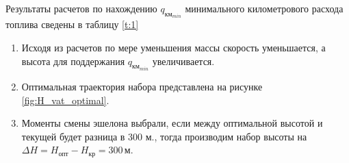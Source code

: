 Результаты расчетов по нахождению $q_{{км}_{min}}$ минимального километрового расхода топлива сведены в таблицу \ref{t:1}

\begin{enumerate}
\item Исходя из расчетов по мере уменьшения массы скорость уменьшается, а высота для поддержания $q_{{км}_{min}}$ увеличивается.
\item Оптимальная траектория набора представлена на рисунке \ref{fig:H_vat_optimal}.
\item Моменты смены эшелона выбрали, если между оптимальной высотой и текущей
    будет разница в 300 м., тогда производим набор высоты на $\Delta H = H_{опт}
    - H_{кр} = 300 \, м$.  
\end{enumerate}
